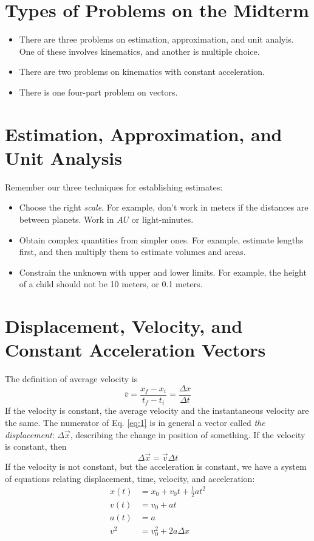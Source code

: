 \documentclass[10pt]{article}
\begin{document}
\maketitle

\section{Types of Problems on the Midterm}
\begin{itemize}
\item There are three problems on estimation, approximation, and unit analyis.  One of these involves kinematics, and another is multiple choice.
\item There are two problems on kinematics with constant acceleration.
\item There is one four-part problem on vectors.
\end{itemize}

\section{Estimation, Approximation, and Unit Analysis}
Remember our three techniques for establishing estimates:
\begin{itemize}
\item Choose the right \textit{scale}.  For example, don't work in meters if the distances are between planets.  Work in $AU$ or light-minutes.
\item Obtain complex quantities from simpler ones.  For example, estimate lengths first, and then multiply them to estimate volumes and areas.
\item Constrain the unknown with upper and lower limits.  For example, the height of a child should not be 10 meters, or 0.1 meters.
\end{itemize}

\section{Displacement, Velocity, and Constant Acceleration Vectors}
The definition of average velocity is
\begin{equation}
\bar{v} = \frac{x_{f} - x_{i}}{t_{f} - t_{i}} = \frac{\Delta x}{\Delta t}
\label{eq:1}
\end{equation}
If the velocity is constant, the average velocity and the instantaneous velocity are the same.  The numerator of Eq. \ref{eq:1} is in general a vector called \textit{the displacement}: $\Delta \vec{x}$, describing the change in position of something.  If the velocity is constant, then
\begin{equation}
\Delta \vec{x} = \vec{v}\Delta t
\label{eq:2}
\end{equation}
If the velocity is not constant, but the acceleration is constant, we have a system of equations relating displacement, time, velocity, and acceleration:
\begin{align}
x(t) &= x_0 + v_0 t + \frac{1}{2} a t^2 \\
v(t) &= v_0 + a t \\
a(t) &= a \\
v^2 &= v_0^2 + 2a\Delta x
\end{align}
\end{document}
